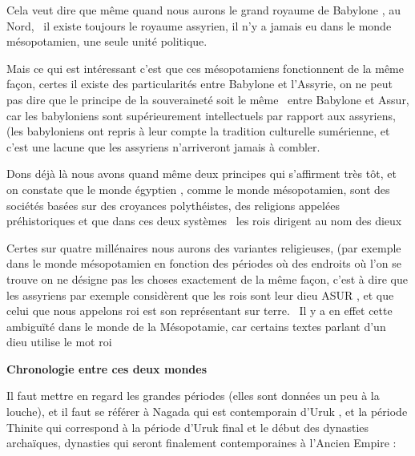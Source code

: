 \documentclass[a4paper]{article}
\begin{document}
{
Cela veut dire que même quand nous aurons le grand royaume de Babylone ,
au Nord, \ il existe toujours le royaume assyrien, il n'y a jamais eu
dans le monde mésopotamien, une seule unité politique.}


\bigskip

{
Mais ce qui est intéressant c'est que ces mésopotamiens fonctionnent de
la même façon, certes il existe des particularités entre Babylone et
l'Assyrie, on ne peut pas dire que le principe de la souveraineté soit
le même \ entre Babylone et Assur, car les babyloniens sont
supérieurement intellectuels par rapport aux assyriens, (les
babyloniens ont repris à leur compte la tradition culturelle
sumérienne, et c'est une lacune que les assyriens n'arriveront jamais à
combler.}


\bigskip

{
Dons déjà là nous avons quand même deux principes qui s'affirment très
tôt, et on constate que le monde égyptien , comme le monde
mésopotamien, sont des sociétés basées sur des croyances polythéistes,
des religions appelées préhistoriques et que dans ces deux systèmes
\ les rois dirigent au nom des dieux}

{
Certes sur quatre millénaires nous aurons des variantes religieuses,
(par exemple dans le monde mésopotamien en fonction des périodes où des
endroits où l'on se trouve on ne désigne pas les choses exactement de
la même façon, c'est à dire que les assyriens par exemple considèrent
que les rois sont leur dieu ASUR , et que celui que nous appelons roi
est son représentant sur terre. \ Il y a en effet cette ambiguïté dans
le monde de la Mésopotamie, car certains textes parlant d'un dieu
utilise le mot roi}


\bigskip


\bigskip


\bigskip


\bigskip


\bigskip


\bigskip


\bigskip


\bigskip


\bigskip

{
\textbf{Chronologie entre ces deux mondes }}


\bigskip

{
Il faut mettre en regard les grandes périodes (elles sont données un peu
à la louche), et il faut se référer à Nagada qui est contemporain
d'Uruk , et la période Thinite qui correspond à la période d'Uruk final
et le début des dynasties archaïques, dynasties qui seront finalement
contemporaines à l'Ancien Empire :}
\end{document}
